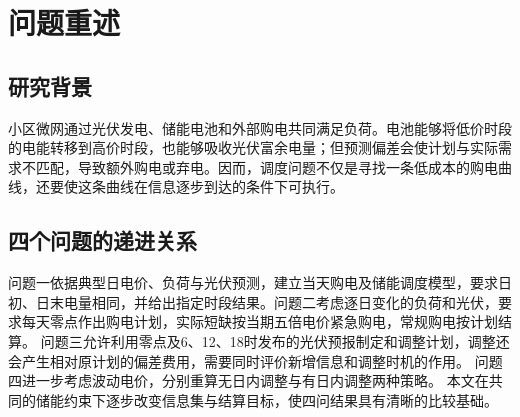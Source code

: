 \section{问题重述}
\subsection{研究背景}
小区微网通过光伏发电、储能电池和外部购电共同满足负荷。电池能够将低价时段的电能转移到高价时段，也能够吸收光伏富余电量；但预测偏差会使计划与实际需求不匹配，导致额外购电或弃电。因而，调度问题不仅是寻找一条低成本的购电曲线，还要使这条曲线在信息逐步到达的条件下可执行。
\subsection{四个问题的递进关系}
问题一依据典型日电价、负荷与光伏预测，建立当天购电及储能调度模型，要求日初、日末电量相同，并给出指定时段结果。问题二考虑逐日变化的负荷和光伏，要求每天零点作出购电计划，实际短缺按当期五倍电价紧急购电，常规购电按计划结算。
问题三允许利用零点及6、12、18时发布的光伏预报制定和调整计划，调整还会产生相对原计划的偏差费用，需要同时评价新增信息和调整时机的作用。
问题四进一步考虑波动电价，分别重算无日内调整与有日内调整两种策略。
本文在共同的储能约束下逐步改变信息集与结算目标，使四问结果具有清晰的比较基础。
